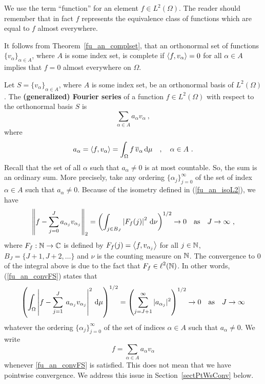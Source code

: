 \begin{rmk}
We use the term ``function'' for an element
$\displaystyle f \in L^2(\Omega)$.  The
reader should remember that in fact $f$ represents the equivalence
class of functions which are equal to $f$ almost everywhere. 
\end{rmk}

It follows from Theorem~\ref{fu_an_complset}, that an orthonormal set
of functions $\displaystyle \{ v_\alpha \}_{\alpha \in A}$, where $A$
is some index set, is complete if
$\left\langle{f} , {v_\alpha}\right\rangle = 0$ for all $\alpha \in A$ implies that $f = 0$
almost everywhere on $\Omega$.

Let $\displaystyle S= \{ v_\alpha \}_{\alpha \in A}$, where $A$ is some
index set, be an orthonormal basis of $\displaystyle L^2(\Omega)$.  
The {\bfseries (generalized) Fourier series}%
 of a function
$\displaystyle f \in L^2(\Omega)$ with respect to the orthonormal basis $S$ is
\[
\sum_{\alpha \in A} a_\alpha v_\alpha \ ,
\]
where
\[
a_\alpha = \left\langle{f} , {v_\alpha}\right\rangle 
= \int_\Omega f\, \overline{v}_\alpha \,\mathrm{d}{\mu} \quad, \quad \alpha \in A \ .
\]
Recall that the set of all $\alpha$ such that $a_\alpha \neq 0$ is at
most countable.  So, the sum is an ordinary sum.  More precisely, take
any ordering $\displaystyle \{ \alpha_j\}_{j=0}^\infty$ of the set of
index $\alpha \in A$ such that $a_\alpha \neq 0$.  Because of the
isometry defined in (\ref{fu_an_isoL2}), we have
\begin{equation} \label{fu_an_convFS}
\left\| f - \sum_{j=0}^{J} a_{\alpha_j} v_{\alpha_j} \right\|_2
= \left( \int_{j \in B_J} \left| F_f(j)\right|^2 \,\mathrm{d}{\nu} \right)^{1/2}
\rightarrow 0 \quad \text{as} \quad J \rightarrow \infty \ ,
\end{equation}
where $F_f:\mathbb{N} \rightarrow \mathbb{C}$ is defined by
$F_f(j) = \left\langle{f} , {v_{\alpha_j}}\right\rangle$ for all
$j\in \mathbb{N}$, $B_J = \{J+1, J+2, \ldots\}$ and $\nu$ is the
counting measure on $\mathbb{N}$.  The convergence to $0$ of the integral
above is due to the fact that $\displaystyle F_f \in \ell^2(\mathbb{N})$.
In other words, (\ref{fu_an_convFS}) states that
\[
\left( \int_\Omega
\left|f - \sum_{j=1}^{J} \: a_{\alpha_j} v_{\alpha_j} \right|^2
\,\mathrm{d}{\mu} \right)^{1/2}
= \left( \sum_{j=J+1}^\infty |a_{\alpha_j}|^2 \right)^{1/2} 
\rightarrow 0 \quad \text{as} \quad
J \rightarrow \infty
\]
whatever the ordering $\displaystyle \{ \alpha_j\}_{j=0}^\infty$ of
the set of indices $\alpha \in A$ such that $a_\alpha \neq 0$.
We write
\[
  f = \sum_{\alpha \in A} a_\alpha v_\alpha
\]
whenever \ref{fu_an_convFS} is satisfied.   This does not mean that we
have pointwise convergence.  We address this issue in
Section~\ref{sectPtWsConv} below.

